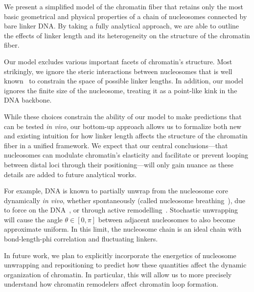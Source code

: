 \documentclass[%
 reprint,
superscriptaddress,
showpacs,preprintnumbers,
 amsmath,amssymb,
 aps,
 prl,
]{revtex4-1}
\begin{document}
We present a simplified model of the chromatin fiber that retains only the most
    basic geometrical and physical properties of a chain of nucleosomes
    connected by bare linker DNA.\@
By taking a fully analytical approach, we are able to outline the effects of
    linker length and its heterogeneity on the structure of the chromatin fiber.

Our model excludes various important facets of chromatin's structure.
Most strikingly, we ignore the steric interactions between nucleosomes that is
    well known~\cite{widom1992} to constrain the space of possible linker
    lengths.
In addition, our model ignores the finite size of the nucleosome, treating it as
    a point-like kink in the DNA backbone.

While these choices constrain the ability of our model to make predictions that
    can be tested \textit{in vivo}, our bottom-up approach allows us to
    formalize both new and existing intuition for how linker length affects the
    structure of the chromatin fiber in a unified framework.
We expect that our central conclusions---that nucleosomes can modulate
    chromatin's elasticity and facilitate or prevent looping between distal loci
    through their positioning---will only gain nuance as these details are added
    to future analytical works.

    For example, DNA is known to partially unwrap from the nucleosome core dynamically \textit{in
    vivo}, whether spontaneously (called nucleosome breathing~\cite{TODO}), due to
    force on the DNA~\cite{TODO}, or through active
    remodelling~\cite{dion2007,kulaeva2007,senavirathne2017}. Stochastic
    unwrapping will cause the angle $\theta \in [0, \pi]$ between adjacent nucleosomes to
    also become approximate uniform. In this limit, the nucleosome chain is an
    ideal chain with bond-length-phi correlation and fluctuating linkers.

    In future work, we plan to explicitly incorporate the energetics of nucleosome unwrapping
    and repositioning to predict how these quantities affect the dynamic
    organization of chromatin. In particular, this will allow us to more
    precisely understand how chromatin remodelers affect chromatin loop
    formation.
\end{document}
